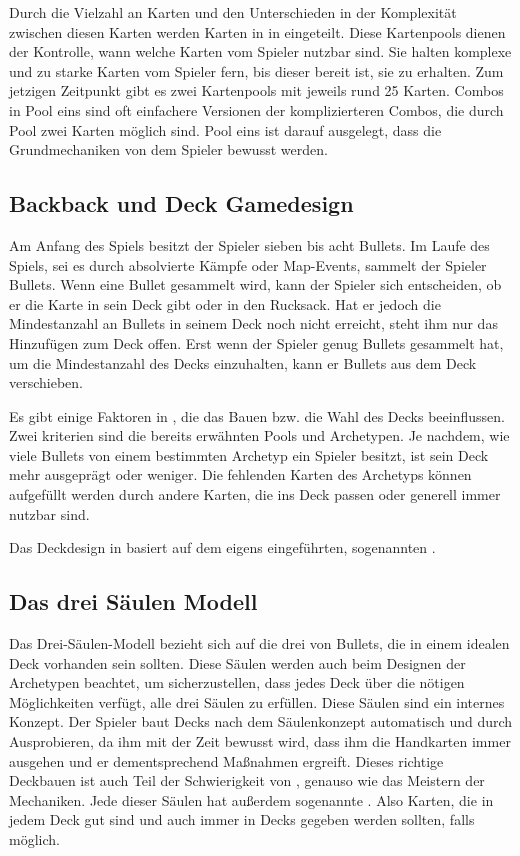 Durch die Vielzahl an Karten und den Unterschieden in der Komplexität zwischen diesen Karten werden Karten in \FF in  eingeteilt.
Diese Kartenpools dienen der Kontrolle, wann welche Karten vom Spieler nutzbar sind.
Sie halten komplexe und zu starke Karten vom Spieler fern, bis dieser bereit ist, sie zu erhalten.
Zum jetzigen Zeitpunkt gibt es zwei Kartenpools mit jeweils rund 25 Karten. Combos in Pool eins sind oft einfachere
Versionen der komplizierteren Combos, die durch Pool zwei Karten möglich sind.
Pool eins ist darauf ausgelegt, dass die Grundmechaniken von \FF dem Spieler bewusst werden.


\subsection{Backback und Deck Gamedesign}\label{subsec:placementMatters}

Am Anfang des Spiels besitzt der Spieler sieben bis acht Bullets. Im Laufe des Spiels, sei es durch absolvierte Kämpfe
oder Map-Events, sammelt der Spieler Bullets. Wenn eine Bullet gesammelt wird, kann der Spieler sich entscheiden,
ob er die Karte in sein Deck gibt oder in den Rucksack. Hat er jedoch die Mindestanzahl an Bullets in seinem Deck
noch nicht erreicht, steht ihm nur das Hinzufügen zum Deck offen. Erst wenn der Spieler genug Bullets gesammelt hat,
um die Mindestanzahl des Decks einzuhalten, kann er Bullets aus dem Deck verschieben.


Es gibt einige Faktoren in \FF, die das Bauen bzw. die Wahl des Decks beeinflussen. Zwei kriterien sind die bereits erwähnten Pools und Archetypen.
Je nachdem, wie viele Bullets von einem bestimmten Archetyp ein Spieler besitzt, ist sein Deck mehr ausgeprägt oder weniger.
Die fehlenden Karten des Archetyps können aufgefüllt werden durch andere Karten, die ins Deck passen oder generell immer nutzbar sind.


Das Deckdesign in \FF basiert auf dem eigens eingeführten, sogenannten .


\subsection{Das drei Säulen Modell}\label{subsec:placementMatters}

Das Drei-Säulen-Modell bezieht sich auf die drei  von Bullets, die in einem idealen Deck vorhanden sein sollten.
Diese Säulen werden auch beim Designen der Archetypen beachtet, um sicherzustellen, dass jedes Deck über die nötigen
Möglichkeiten verfügt, alle drei Säulen zu erfüllen. Diese Säulen sind ein internes Konzept.
Der Spieler baut Decks nach dem Säulenkonzept automatisch und durch Ausprobieren, da ihm mit der Zeit bewusst wird,
dass ihm \zB die Handkarten immer ausgehen und er dementsprechend Maßnahmen ergreift. Dieses richtige Deckbauen
ist auch Teil der Schwierigkeit von \FF, genauso wie das Meistern der Mechaniken. Jede dieser Säulen hat außerdem sogenannte .
Also Karten, die in jedem Deck gut sind und auch immer in Decks gegeben werden sollten, falls möglich.


